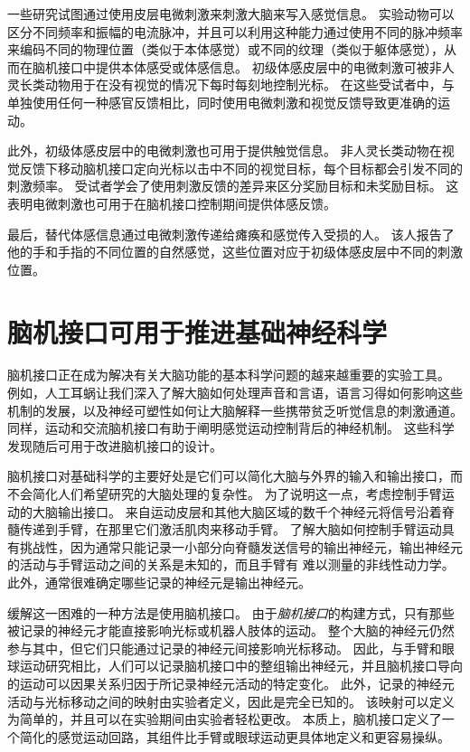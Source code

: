 一些研究试图通过使用皮层电微刺激来刺激大脑来写入感觉信息。
实验动物可以区分不同频率和振幅的电流脉冲，并且可以利用这种能力通过使用不同的脉冲频率来编码不同的物理位置（类似于本体感觉）或不同的纹理（类似于躯体感觉），从而在脑机接口中提供本体感受或体感信息。
初级体感皮层中的电微刺激可被非人灵长类动物用于在没有视觉的情况下每时每刻地控制光标。
在这些受试者中，与单独使用任何一种感官反馈相比，同时使用电微刺激和视觉反馈导致更准确的运动。


此外，初级体感皮层中的电微刺激也可用于提供触觉信息。
非人灵长类动物在视觉反馈下移动脑机接口定向光标以击中不同的视觉目标，每个目标都会引发不同的刺激频率。 
受试者学会了使用刺激反馈的差异来区分奖励目标和未奖励目标。
这表明电微刺激也可用于在脑机接口控制期间提供体感反馈。


最后，替代体感信息通过电微刺激传递给瘫痪和感觉传入受损的人。
该人报告了他的手和手指的不同位置的自然感觉，这些位置对应于初级体感皮层中不同的刺激位置。



\section{脑机接口可用于推进基础神经科学}

脑机接口正在成为解决有关大脑功能的基本科学问题的越来越重要的实验工具。
例如，人工耳蜗让我们深入了解大脑如何处理声音和言语，语言习得如何影响这些机制的发展，以及神经可塑性如何让大脑解释一些携带贫乏听觉信息的刺激通道。
同样，运动和交流脑机接口有助于阐明感觉运动控制背后的神经机制。
这些科学发现随后可用于改进脑机接口的设计。


脑机接口对基础科学的主要好处是它们可以简化大脑与外界的输入和输出接口，而不会简化人们希望研究的大脑处理的复杂性。
为了说明这一点，考虑控制手臂运动的大脑输出接口。
来自运动皮层和其他大脑区域的数千个神经元将信号沿着脊髓传递到手臂，在那里它们激活肌肉来移动手臂。
了解大脑如何控制手臂运动具有挑战性，因为通常只能记录一小部分向脊髓发送信号的输出神经元，输出神经元的活动与手臂运动之间的关系是未知的，而且手臂有 难以测量的非线性动力学。
此外，通常很难确定哪些记录的神经元是输出神经元。


缓解这一困难的一种方法是使用脑机接口。
由于\textit{脑机接口}的构建方式，只有那些被记录的神经元才能直接影响光标或机器人肢体的运动。
整个大脑的神经元仍然参与其中，但它们只能通过记录的神经元间接影响光标移动。
因此，与手臂和眼球运动研究相比，人们可以记录脑机接口中的整组输出神经元，并且脑机接口导向的运动可以因果关系归因于所记录神经元活动的特定变化。
此外，记录的神经元活动与光标移动之间的映射由实验者定义，因此是完全已知的。
该映射可以定义为简单的，并且可以在实验期间由实验者轻松更改。
本质上，脑机接口定义了一个简化的感觉运动回路，其组件比手臂或眼球运动更具体地定义和更容易操纵。


